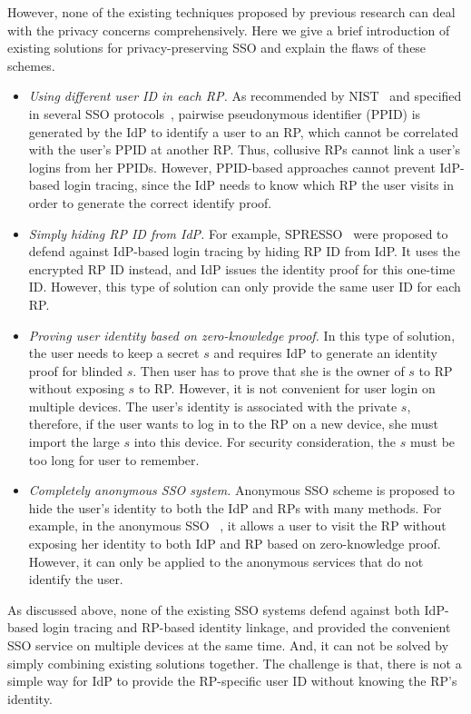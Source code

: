 However, none of the existing techniques proposed by previous research can deal with the privacy concerns comprehensively. Here we give a brief introduction of existing solutions for privacy-preserving SSO and explain the flaws of these schemes. 
\begin{itemize}
\item {\em Using different user ID in each RP. }As recommended by NIST~\cite{NIST2017draft} and specified in several SSO protocols~\cite{OpenIDConnect, SAMLIdentifier}, pairwise pseudonymous identifier (PPID) is generated by the IdP to identify a user to an RP, which cannot be correlated with the user's PPID at another RP. Thus, collusive RPs cannot link a user's logins from her PPIDs. However, PPID-based approaches cannot prevent IdP-based login tracing, since the IdP needs to know which RP the user visits in order to generate the correct identify proof.
\item {\em Simply hiding RP ID from IdP. }For example, SPRESSO~\cite{SPRESSO} were proposed to defend against IdP-based login tracing by hiding RP ID from IdP. It uses the encrypted RP ID instead, and IdP issues the identity proof for this one-time ID. However, this type of solution can only provide the same user ID for each RP.
\item {\em Proving user identity based on zero-knowledge proof. }In this type of solution, the user needs to keep a secret $s$ and requires IdP to generate an identity proof for blinded $s$. Then user has to prove that she is the owner of $s$ to RP without exposing $s$ to RP. However, it is not convenient for user login on multiple devices. The user's identity is associated with the private $s$, therefore, if the user wants to log in to the RP on a new device, she must import the large $s$ into this device. For security consideration, the $s$ must be too long for user to remember. 
\item {\em Completely anonymous SSO system. }Anonymous SSO scheme is proposed to hide the user's identity to both the IdP and RPs with many methods. For example, in the anonymous SSO ~\cite{HanCSTW18}, it allows a user to visit the RP without exposing her identity to both IdP and RP based on zero-knowledge proof. However, it can only be applied to the anonymous services that do not identify the user.
\end{itemize}


As discussed above, none of the existing SSO systems defend against both IdP-based login tracing and RP-based identity linkage, and provided the convenient SSO service on multiple devices at the same time.
And, it can not be solved by simply combining existing solutions together. The challenge is that, there is not a simple way for IdP to provide the RP-specific user ID without knowing the RP's identity.

